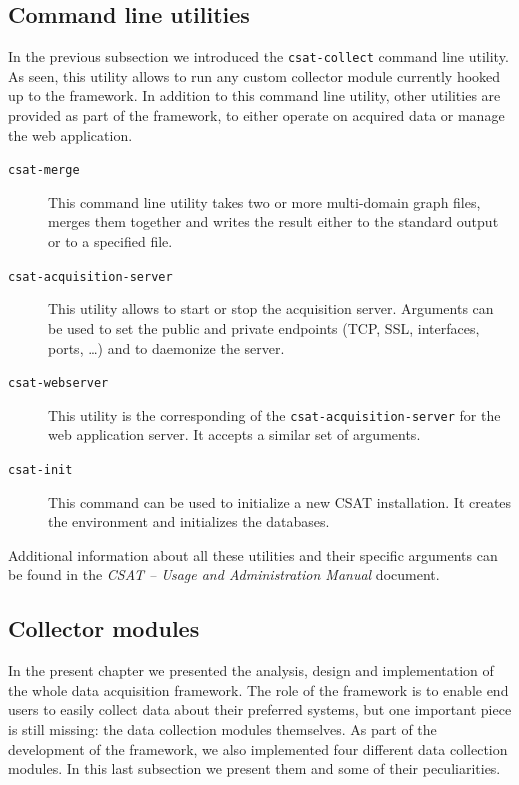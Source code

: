 \subsection{Command line utilities}

In the previous subsection we introduced the \texttt{csat-collect} command line utility. As seen, this utility allows to run any custom collector module currently hooked up to the framework. In addition to this command line utility, other utilities are provided as part of the framework, to either operate on acquired data or manage the web application.

\begin{description}
  \item[\texttt{csat-merge}] 
    This command line utility takes two or more multi-domain graph files, merges them together and writes the result either to the standard output or to a specified file.
  \item[\texttt{csat-acquisition-server}] This utility allows to start or stop the acquisition server. Arguments can be used to set the public and private endpoints (TCP, SSL, interfaces, ports, \ldots) and to daemonize the server.
  \item[\texttt{csat-webserver}] This utility is the corresponding of the \texttt{csat-acquisition-server} for the web application server. It accepts a similar set of arguments.
  \item[\texttt{csat-init}] This command can be used to initialize a new CSAT installation. It creates the environment and initializes the databases.
\end{description}

Additional information about all these utilities and their specific arguments can be found in the \emph{CSAT -- Usage and Administration Manual} document.

\subsection{Collector modules}

In the present chapter we presented the analysis, design and implementation of the whole data acquisition framework. The role of the framework is to enable end users to easily collect data about their preferred systems, but one important piece is still missing: the data collection modules themselves. As part of the development of the framework, we also implemented four different data collection modules. In this last subsection we present them and some of their peculiarities.

